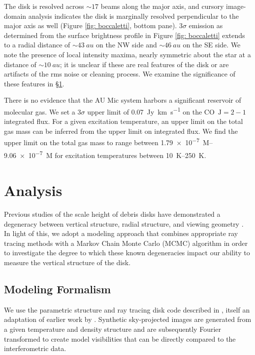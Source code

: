 \documentclass[modern]{aastex62}
\begin{document}
The disk is resolved across $\sim 17$ beams along the major axis, and cursory image-domain analysis indicates the disk is marginally resolved perpendicular to the major axis as well (Figure \ref{fig: boccaletti}, bottom pane).
$3\sigma$ emission as determined from the surface brightness profile in Figure \ref{fig: boccaletti} extends to a radial distance of $\sim \SI{43}{au}$ on the NW side and $\sim \SI{46}{au}$ on the SE side. 
We note the presence of local intensity maxima, nearly symmetric about the star at a distance of $\sim \SI{10}{au}$; it is unclear if these are real features of the disk or are artifacts of the rms noise or cleaning process. 
We examine the significance of these features in \S \ref{section: analysis}.

There is no evidence that the AU Mic system harbors a significant reservoir of molecular gas.
We set a $3 \sigma$ upper limit of \SI{0.07}{Jy.km.s^{-1}} on the CO~$\mathrm{J}=2-1$ integrated flux.
For a given excitation temperature, an upper limit on the total gas mass can be inferred from the upper limit on integrated flux.
We find the upper limit on the total gas mass to range between \SIrange[range-phrase=\ and\ ]{1.79e-7}{9.06e-7}{M_\earth} for excitation temperatures between \SIrange[range-phrase=\ and\ ]{10}{250}{K}.


\section{Analysis}
\label{section: analysis}
Previous studies of the scale height of debris disks have demonstrated a degeneracy between vertical structure, radial structure, and viewing geometry \citep[e.g.,][]{milli14}.  
In light of this, we adopt a modeling approach that combines appropriate ray tracing methods with a Markov Chain Monte Carlo (MCMC) algorithm in order to investigate the degree to which these known degeneracies impact our ability to measure the vertical structure of the disk.  

\subsection{Modeling Formalism}

We use the parametric structure and ray tracing disk code described in \cite{flaherty15}, itself an adaptation of earlier work by \cite{rosenfeld13}.
Synthetic sky-projected images are generated from a given temperature and density structure and are subsequently Fourier transformed to create model visibilities that can be directly compared to the interferometric data.
\end{document}
